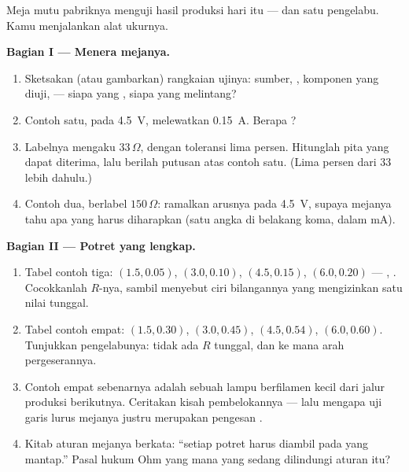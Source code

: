 \begin{problem}\label{pb:g8:ohms-law:1}
Meja mutu pabriknya menguji hasil produksi hari itu --- dan satu
pengelabu. Kamu menjalankan alat ukurnya.

\medskip\noindent\textbf{Bagian I --- Menera mejanya.}
\begin{enumerate}
  \item Sketsakan (atau gambarkan) rangkaian ujinya: sumber,
        , komponen yang diuji,  --- siapa yang
        , siapa yang melintang?
  \item Contoh satu, pada \qty{4.5}{V}, melewatkan \qty{0.15}{A}.
        Berapa ?
  \item Labelnya mengaku $33\,\Omega$, dengan toleransi lima persen.
        Hitunglah pita yang dapat diterima, lalu berilah putusan atas
        contoh satu. (Lima persen dari $33$ lebih dahulu.)
  \item Contoh dua, berlabel $150\,\Omega$: ramalkan arusnya pada
        \qty{4.5}{V}, supaya mejanya tahu apa yang harus diharapkan
        (satu angka di belakang koma, dalam \unit{mA}).
\end{enumerate}

\medskip\noindent\textbf{Bagian II --- Potret yang lengkap.}
\begin{enumerate}[resume]
  \item Tabel contoh tiga: $(1.5, 0.05)$, $(3.0, 0.10)$,
        $(4.5, 0.15)$, $(6.0, 0.20)$ --- , . Cocokkanlah
        $R$-nya, sambil menyebut ciri bilangannya yang mengizinkan
        satu nilai tunggal.
  \item Tabel contoh empat: $(1.5, 0.30)$, $(3.0, 0.45)$,
        $(4.5, 0.54)$, $(6.0, 0.60)$. Tunjukkan pengelabunya: tidak
        ada $R$ tunggal, dan ke mana arah pergeserannya.
  \item Contoh empat sebenarnya adalah sebuah lampu berfilamen kecil
        dari jalur produksi berikutnya. Ceritakan kisah
        pembelokannya --- lalu mengapa uji garis lurus mejanya justru
        merupakan pengesan .
  \item Kitab aturan mejanya berkata: ``setiap potret harus diambil
        pada  yang mantap.'' Pasal hukum Ohm yang mana yang
        sedang dilindungi aturan itu?
\end{enumerate}


\end{problem}
